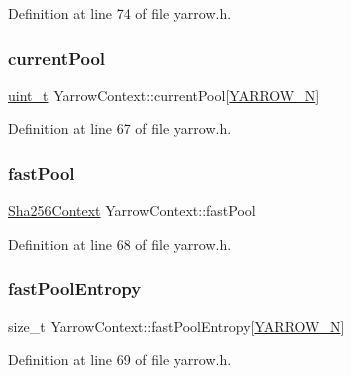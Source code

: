 Definition at line 74 of file yarrow.\+h.

\mbox{\label{structYarrowContext_ab70fd1773a6e3de3ab5be0149bb1d3f0}} 
\subsubsection{\texorpdfstring{current\+Pool}{currentPool}}
{\footnotesize\ttfamily \hyperlink{compiler__port_8h_a12a1e9b3ce141648783a82445d02b58d}{uint\+\_\+t} Yarrow\+Context\+::current\+Pool\mbox{[}\hyperlink{yarrow_8h_a26ee6536b9ff794ba4a21956c7dc44a5}{Y\+A\+R\+R\+O\+W\+\_\+N}\mbox{]}}



Definition at line 67 of file yarrow.\+h.

\mbox{\label{structYarrowContext_a0cc3cd3fb0c205a927a72c384ade1b29}} 
\subsubsection{\texorpdfstring{fast\+Pool}{fastPool}}
{\footnotesize\ttfamily \hyperlink{structSha256Context}{Sha256\+Context} Yarrow\+Context\+::fast\+Pool}



Definition at line 68 of file yarrow.\+h.

\mbox{\label{structYarrowContext_aa98934d1f80991748c2ae6ce898dee2c}} 
\subsubsection{\texorpdfstring{fast\+Pool\+Entropy}{fastPoolEntropy}}
{\footnotesize\ttfamily size\+\_\+t Yarrow\+Context\+::fast\+Pool\+Entropy\mbox{[}\hyperlink{yarrow_8h_a26ee6536b9ff794ba4a21956c7dc44a5}{Y\+A\+R\+R\+O\+W\+\_\+N}\mbox{]}}



Definition at line 69 of file yarrow.\+h.

